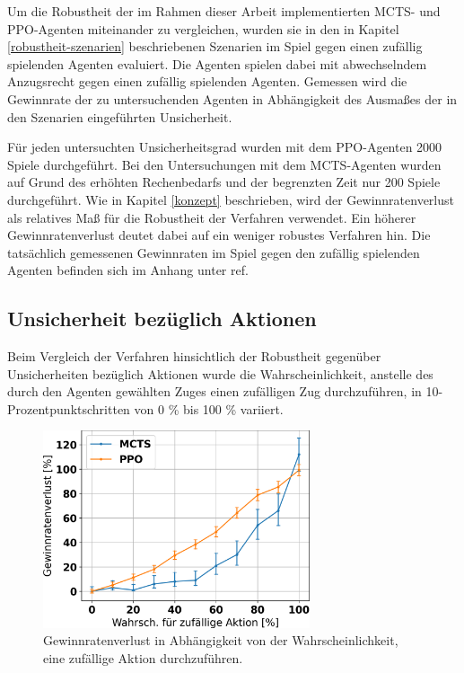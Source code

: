 Um die Robustheit der im Rahmen dieser Arbeit implementierten MCTS- und PPO-Agenten miteinander zu vergleichen, wurden sie in den in Kapitel \ref{robustheit-szenarien} beschriebenen Szenarien im Spiel gegen einen zufällig spielenden Agenten evaluiert. Die Agenten spielen dabei mit abwechselndem Anzugsrecht gegen einen zufällig spielenden Agenten. Gemessen wird die Gewinnrate der zu untersuchenden Agenten in Abhängigkeit des Ausmaßes der in den Szenarien eingeführten Unsicherheit.

Für jeden untersuchten Unsicherheitsgrad wurden mit dem PPO-Agenten 2000 Spiele durchgeführt. Bei den Untersuchungen mit dem MCTS-Agenten wurden auf Grund des erhöhten Rechenbedarfs und der begrenzten Zeit nur 200 Spiele durchgeführt. Wie in Kapitel \ref{konzept} beschrieben, wird der Gewinnratenverlust als relatives Maß für die Robustheit der Verfahren verwendet. Ein höherer Gewinnratenverlust deutet dabei auf ein weniger robustes Verfahren hin. Die tatsächlich gemessenen Gewinnraten im Spiel gegen den zufällig spielenden Agenten befinden sich im Anhang unter ref{}.

\subsection{Unsicherheit bezüglich Aktionen}

\label{uncertain-actions-result}

Beim Vergleich der Verfahren hinsichtlich der Robustheit gegenüber Unsicherheiten bezüglich Aktionen wurde die Wahrscheinlichkeit, anstelle des durch den Agenten gewählten Zuges einen zufälligen Zug durchzuführen, in 10-Prozentpunktschritten von 0 \% bis 100 \% variiert.

\begin{figure}[ht!]%
	\includegraphics[width=0.7\textwidth, center]{Bilder/robustness-results/uncertain_actions_win_rate_losses.png}
	\caption{Gewinnratenverlust in Abhängigkeit von der Wahrscheinlichkeit, eine zufällige Aktion durchzuführen.}
\end{figure}

